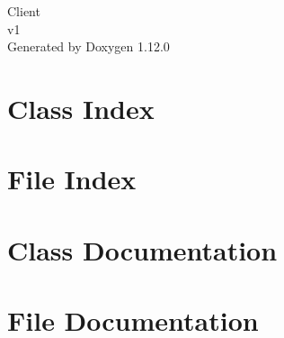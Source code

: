 \documentclass[twoside]{book}
\newcommand{\+}{\discretionary{\mbox{\scriptsize$\hookleftarrow$}}{}{}}
\newcommand{\clearemptydoublepage}{%
    \newpage{\pagestyle{empty}\cleardoublepage}%
  }
\begin{document}
  \raggedbottom
    \hypersetup{pageanchor=false,
                bookmarksnumbered=true,
                pdfencoding=unicode
               }
  \begin{titlepage}
  \vspace*{7cm}
  \begin{center}%
  {\Large Client}\\
  [1ex]\large v1 \\
  \vspace*{1cm}
  {\large Generated by Doxygen 1.12.0}\\
  \end{center}
  \end{titlepage}
  \clearemptydoublepage
  \tableofcontents
  \clearemptydoublepage
  \hypersetup{pageanchor=true}
\chapter{Class Index}

\chapter{File Index}

\chapter{Class Documentation}

\chapter{File Documentation}




  \backmatter
  \newpage
  \clearemptydoublepage
  \printindex
\end{document}
